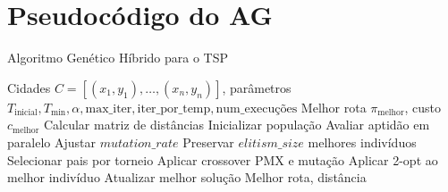 \documentclass[12pt]{article}
\begin{document}
\section{Pseudocódigo do AG}\label{app:ag}
\begin{algorithm}
    \caption{Algoritmo Genético Híbrido para o TSP}
    \begin{algorithmic}[1]
        \Require Cidades \(C = [(x_1, y_1), \ldots, (x_n, y_n)]\), parâmetros \(T_{\text{inicial}}, T_{\text{min}}, \alpha, \text{max\_iter}, \text{iter\_por\_temp}, \text{num\_execuções}\)
        \Ensure Melhor rota \(\pi_{\text{melhor}}\), custo \(c_{\text{melhor}}\)
        \State Calcular matriz de distâncias
        \State Inicializar população
        \State Avaliar aptidão em paralelo
            \State Ajustar \(mutation\_rate\)
            \State Preservar \(elitism\_size\) melhores indivíduos
                \State Selecionar pais por torneio
                \State Aplicar crossover PMX e mutação
            \EndWhile
                \State Aplicar 2-opt ao melhor indivíduo
            \EndIf
            \State Atualizar melhor solução
        \EndFor
        \State \Return Melhor rota, distância
    \end{algorithmic}
\end{algorithm}
\end{document}
